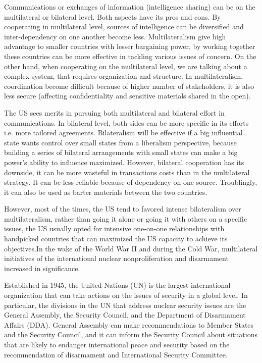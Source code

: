 \documentclass{report}
\begin{document}
Communications or exchanges of information (intelligence sharing) can be on the multilateral or bilateral level. Both aspects have its pros and cons. By cooperating in multilateral level, sources of intelligence can be diversified and inter-dependency on one another become less. Multilateralism give high advantage to smaller countries with lesser bargaining power, by working together these countries can be more effective in tackling various issues of concern. On the other hand, when cooperating on the multilateral level, we are talking about a complex system, that requires organization and structure. In multilateralism, coordination become difficult because of higher number of stakeholders, it is also less secure (affecting confidentiality and sensitive materials shared in the open).


The US sees merits in pursuing both multilateral and bilateral effort in communications. In bilateral level, both sides can be more specific in its efforts i.e. more tailored agreements. Bilateralism will be effective if a big influential state wants control over small states from a liberalism perspective, because building a series of bilateral arrangements with small states can make a big power’s ability to influence maximized. However, bilateral cooperation has its downside, it can be more wasteful in transactions costs than in the multilateral strategy. It can be less reliable because of dependency on one source. Troublingly, it can also be used as barter materials between the two countries.


However, most of the times, the US tend to favored intense bilateralism over multilateralism, rather than going it alone or going it with others on a specific issues, the US usually opted for intensive one-on-one relationships with handpicked countries that can maximized the US capacity to achieve its objectives.In the wake of the World War II and during the Cold War, multilateral initiatives of the international nuclear nonproliferation and  disarmament increased in significance.


Established in 1945, the United Nations (UN) is the largest international organization that can take actions on the issues of security in a global level. In particular, the divisions in the UN that address nuclear security issues are the General Assembly, the Security Council, and the Department of Disarmament Affairs (DDA). General Assembly can make recommendations to Member States and the Security Council, and it can inform the Security Council about situations that are likely to endanger international peace and security based on the recommendation of disarmament and International Security Committee. 
\end{document}
